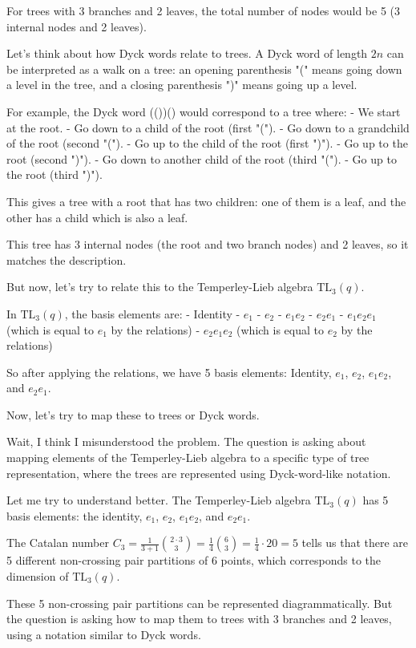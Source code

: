 \documentclass[12p]{article}
\newcounter{reasoningcounter}
\newenvironment{reasoning}[1][]
{\refstepcounter{reasoningcounter}%
\begin{tcolorbox}[
    title=Reasoning \thereasoningcounter: #1,
    colback=white, %
    colframe=gray,
    coltext=black, %
    fonttitle=\bfseries\normalsize,
    top=2mm,
    bottom=2mm,
    enlarge top initially by=5mm
]
\small
}
{\end{tcolorbox}}
\begin{document}
\begin{reasoning}
For trees with 3 branches and 2 leaves, the total number of nodes would be 5 (3 internal nodes and 2 leaves).

Let's think about how Dyck words relate to trees. A Dyck word of length $2n$ can be interpreted as a walk on a tree: an opening parenthesis "(" means going down a level in the tree, and a closing parenthesis ")" means going up a level.

For example, the Dyck word (())() would correspond to a tree where:
- We start at the root.
- Go down to a child of the root (first "(").
- Go down to a grandchild of the root (second "(").
- Go up to the child of the root (first ")").
- Go up to the root (second ")").
- Go down to another child of the root (third "(").
- Go up to the root (third ")").

This gives a tree with a root that has two children: one of them is a leaf, and the other has a child which is also a leaf.

This tree has 3 internal nodes (the root and two branch nodes) and 2 leaves, so it matches the description.

But now, let's try to relate this to the Temperley-Lieb algebra $\text{TL}_3(q)$.

In $\text{TL}_3(q)$, the basis elements are:
- Identity
- $e_1$
- $e_2$
- $e_1 e_2$
- $e_2 e_1$
- $e_1 e_2 e_1$ (which is equal to $e_1$ by the relations)
- $e_2 e_1 e_2$ (which is equal to $e_2$ by the relations)

So after applying the relations, we have 5 basis elements: Identity, $e_1$, $e_2$, $e_1 e_2$, and $e_2 e_1$.

Now, let's try to map these to trees or Dyck words.

Wait, I think I misunderstood the problem. The question is asking about mapping elements of the Temperley-Lieb algebra to a specific type of tree representation, where the trees are represented using Dyck-word-like notation.

Let me try to understand better. The Temperley-Lieb algebra $\text{TL}_3(q)$ has 5 basis elements: the identity, $e_1$, $e_2$, $e_1 e_2$, and $e_2 e_1$. 

The Catalan number $C_3 = \frac{1}{3+1}\binom{2\cdot 3}{3} = \frac{1}{4}\binom{6}{3} = \frac{1}{4} \cdot 20 = 5$ tells us that there are 5 different non-crossing pair partitions of 6 points, which corresponds to the dimension of $\text{TL}_3(q)$.

These 5 non-crossing pair partitions can be represented diagrammatically. But the question is asking how to map them to trees with 3 branches and 2 leaves, using a notation similar to Dyck words.


\end{reasoning}
\end{document}
